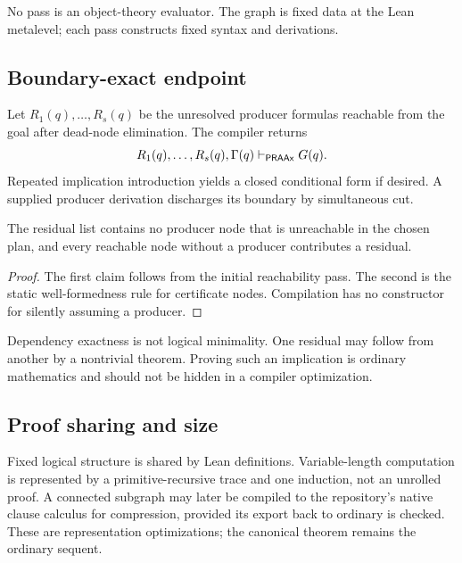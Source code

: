 No pass is an object-theory evaluator.  The graph is fixed data at the Lean
metalevel; each pass constructs fixed syntax and derivations.

\subsection{Boundary-exact endpoint}

Let \(R_1(q),\ldots,R_s(q)\) be the unresolved producer formulas reachable from
the goal after dead-node elimination.  The compiler returns
\[
   R_1(q),\ldots,R_s(q),\Gamma(q)
      \mathrel{\vdash_{\mathsf{PRAAx}}} G(q).
\]
Repeated implication introduction yields a closed conditional form if desired.
A supplied producer derivation discharges its boundary by simultaneous cut.

\begin{proposition}
The residual list contains no producer node that is unreachable in the chosen
plan, and every reachable node without a producer contributes a residual.
\end{proposition}

\begin{proof}
The first claim follows from the initial reachability pass.  The second is the
static well-formedness rule for certificate nodes.  Compilation has no
constructor for silently assuming a producer.
\end{proof}

Dependency exactness is not logical minimality.  One residual may follow from
another by a nontrivial theorem.  Proving such an implication is ordinary
mathematics and should not be hidden in a compiler optimization.

\subsection{Proof sharing and size}

Fixed logical structure is shared by Lean definitions.  Variable-length
computation is represented by a primitive-recursive trace and one induction,
not an unrolled proof.  A connected subgraph may later be compiled to the
repository's native clause calculus for compression, provided its export back
to ordinary  is checked.  These are representation
optimizations; the canonical theorem remains the ordinary sequent.
